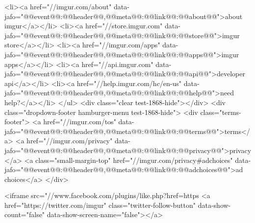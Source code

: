                             <li><a href="//imgur.com/about"  data-jafo="{@@event@@:@@header@@,@@meta@@:{@@link@@:@@about@@}}">about imgur</a></li>
                            <li><a href="//store.imgur.com" data-jafo="{@@event@@:@@header@@,@@meta@@:{@@link@@:@@store@@}}">imgur store</a></li>
                            <li><a href="//imgur.com/apps"  data-jafo="{@@event@@:@@header@@,@@meta@@:{@@link@@:@@apps@@}}">imgur apps</a></li>
                            <li><a href="//api.imgur.com" data-jafo="{@@event@@:@@header@@,@@meta@@:{@@link@@:@@api@@}}">developer api</a></li>
                            <li><a href="//help.imgur.com/hc/en-us" data-jafo="{@@event@@:@@header@@,@@meta@@:{@@link@@:@@help@@}}">need help?</a></li>
                        </ul>
                        <div class="clear test-1868-hide"></div>
                        <div class="dropdown-footer hamburger-menu test-1868-hide">
                            <div class="terms-footer">
                                <a href="//imgur.com/tos"  data-jafo="{@@event@@:@@header@@,@@meta@@:{@@link@@:@@terms@@}}">terms</a>
                                <a href="//imgur.com/privacy"  data-jafo="{@@event@@:@@header@@,@@meta@@:{@@link@@:@@privacy@@}}">privacy</a>
                                <a class="small-margin-top" href="//imgur.com/privacy#adchoices" data-jafo="{@@event@@:@@header@@,@@meta@@:{@@link@@:@@adchoices@@}}">ad choices</a>
                            </div>
                             
                                <iframe src="//www.facebook.com/plugins/like.php?href=https%
                                <a href="https://twitter.com/imgur" class="twitter-follow-button" data-show-count="false" data-show-screen-name="false"></a>
                            
